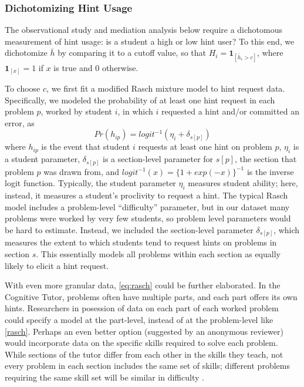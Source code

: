 \documentclass{article}\usepackage[]{graphicx}\usepackage[]{color}
\newcommand{\indicator}[1]{\mathbf{1}_{\left[ {#1} \right] }}
\begin{document}
\subsubsection{Dichotomizing Hint Usage}\label{sec:dichotomizingHintUsage}
The observational study and mediation analysis below require a dichotomous measurement of hint usage: is a
student a high or low hint user?
To this end, we dichotomize $\bar{h}$ by comparing it to a cutoff value, so
that $H_i=\indicator{\bar{h}_i>c}$, where $\indicator{x}=1$ if $x$ is true
and 0 otherwise.

To choose $c$, we first fit a modified Rasch mixture model
\citep{rasch} to hint request data.
Specifically, we modeled the probability of at least one hint request in each problem
$p$, worked by student $i$, in which $i$ requested a hint and/or
committed an error, as
\begin{equation}\label{eq:rasch}
Pr(h_{ip})=logit^{-1}(\eta_i+\delta_{s[p]})
\end{equation}
where $h_{ip}$ is the event that student $i$ requests at least one hint on
problem $p$, $\eta_i$ is a student parameter, $\delta_{s[p]}$ is a
section-level parameter for $s[p]$, the section that problem $p$ was
drawn from, and $logit^{-1}(x)=\{1+exp(-x)\}^{-1}$ is the inverse logit
function.
Typically, the student parameter $\eta_i$ measures student ability;
here, instead, it measures a student's proclivity to request a hint.
The typical Rasch model includes a problem-level ``difficulty'' parameter, but in our
dataset many problems were worked by very few students, so problem
level parameters would be hard to estimate.
Instead, we included the section-level parameter $\delta_{s[p]}$,
which measures the extent to which students tend to request hints on
problems in section $s$.
This essentially models all problems within each section as equally
likely to elicit a hint request.

With even more granular data, \eqref{eq:rasch} could be further elaborated.
In the Cognitive Tutor, problems often have multiple parts, and each part offers its own hints.
Researchers in posession of data on each part of each worked problem could specify a model at the part-level, instead of at the problem-level like \eqref{rasch}.
Perhaps an even better option (suggested by an anonymous reviewer) would incorporate data on the specific skills required to solve each problem.
While sections of the tutor differ from each other in the skills they teach, not every problem in each section includes the same set of skills; different problems requiring the same skill set will be similar in difficulty \citep[see, e.g.]{goldin2012learner,pavlik2009performance}.
\end{document}
